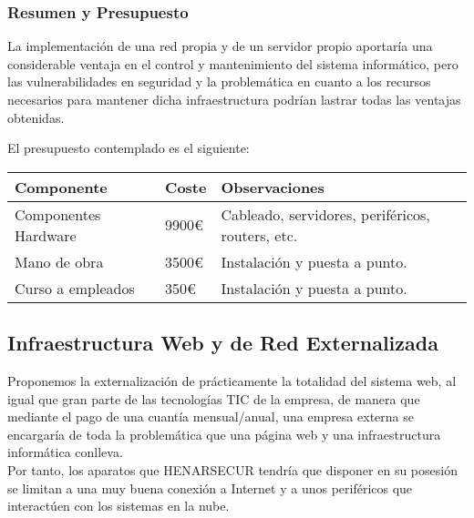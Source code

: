 \documentclass[12pt,letterpaper]{article}
\begin{document}
			\subsubsection{Resumen y Presupuesto}
	La implementación de una red propia y de un servidor propio aportaría una considerable ventaja en el control y mantenimiento del sistema informático, pero las vulnerabilidades en seguridad y la problemática en cuanto a los recursos necesarios para mantener dicha infraestructura podrían lastrar todas las ventajas obtenidas.\par
	El presupuesto contemplado es el siguiente:
	\begin{center}
    \begin{tabular}{ | l | l | p{7cm} |}
    \hline
    Componente & Coste & Observaciones \\ \hline
    Componentes Hardware & 9900€& Cableado, servidores, periféricos, routers, etc. \\ \hline
    Mano de obra & 3500€ & Instalación y puesta a punto. \\ \hline
    Curso a empleados & 350€ & Instalación y puesta a punto. \\ \hline
    \end{tabular}
	\end{center}
	
	\newpage
	
	
		\subsection{Infraestructura Web y de Red Externalizada}
	Proponemos la externalización de prácticamente la totalidad del sistema web, al igual que gran parte de las tecnologías TIC de la empresa, de manera que mediante el pago de una cuantía mensual/anual, una empresa externa se encargaría de toda la problemática que una página web y una infraestructura informática conlleva.\\
	Por tanto, los aparatos que HENARSECUR tendría que disponer en su posesión se limitan a una muy buena conexión a Internet y a unos periféricos que interactúen con los sistemas en la nube.
\end{document}
